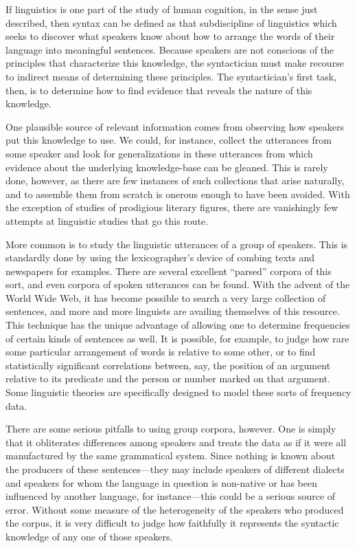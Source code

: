 If linguistics is one part of the study of human cognition, in the sense just described, then syntax can be defined as that subdiscipline of linguistics which seeks to discover what speakers know about how to arrange the words of their language into meaningful sentences. Because speakers are not conscious of the principles that characterize this knowledge, the syntactician must make recourse to indirect means of determining these principles. The syntactician's first task, then, is to determine how to find evidence that reveals the nature of this knowledge.

One plausible source of relevant information comes from observing how speakers put this knowledge to use. We could, for instance, collect the utterances from some speaker and look for generalizations in these utterances from which evidence about the underlying knowledge-base can be gleaned. This is rarely done, however, as there are few instances of such collections that arise naturally, and to assemble them from scratch is onerous enough to have been avoided. With the exception of studies of prodigious literary figures, there are vanishingly few attempts at linguistic studies that go this route.

More common is to study the linguistic utterances of a group of speakers. This is standardly done by using the lexicographer's device of combing texts and newspapers for examples. There are several excellent ``parsed'' corpora of this sort, and even corpora of spoken utterances can be found. With the advent of the World Wide Web, it has become possible to search a very large collection of sentences, and more and more linguists are availing themselves of this resource. This technique has the unique advantage of allowing one to determine frequencies of certain kinds of sentences as well. It is possible, for example, to judge how rare some particular arrangement of words is relative to some other, or to find statistically significant correlations between, say, the position of an argument relative to its predicate and the person or number marked on that argument. Some linguistic theories are specifically designed to model these sorts of frequency data.

There are some serious pitfalls to using group corpora, however. One is simply that it obliterates differences among speakers and treats the data as if it were all manufactured by the same grammatical system. Since nothing is known about the producers of these sentences---they may include speakers of different dialects and speakers for whom the language in question is non-native or has been influenced by another language, for instance---this could be a serious source of error. Without some measure of the heterogeneity of the speakers who produced the corpus, it is very difficult to judge how faithfully it represents the syntactic knowledge of any one of those speakers.

